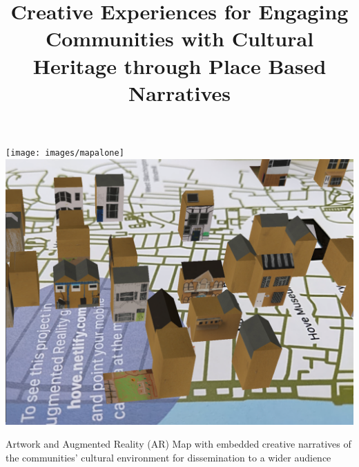 \documentclass[acmlarge,screen,dvipsnames]{acmart}
\begin{document}
%


\title[Creative Experiences for engaging communities with Cultural Heritage]%
      {Creative Experiences for Engaging Communities with Cultural Heritage through  Place Based Narratives}
%



%
\renewcommand{\shortauthors}{K. Rodriguez, et al.}

%
\begin{teaserfigure}
\centering
 \texttt{[image: images/mapalone]}
 \includegraphics[width=.40\linewidth]{images/screenshoot}
  \caption{Artwork and Augmented Reality (AR) Map
with embedded creative narratives of the communities' cultural environment 
for dissemination to a wider audience\vspace*{0.5\baselineskip}}
  \label{fig:teaser}
\end{teaserfigure}
\end{document}
